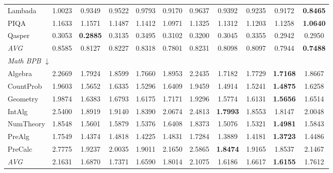 \begin{table}[htbp]
\begin{tabular}{lcccccccccc}
Lambada & 1.0023 & 0.9349 & 0.9522 & 0.9793 & 0.9170 & 0.9637 & 0.9392 & 0.9235 & 0.9172 & \textbf{0.8465} \\
PIQA & 1.1633 & 1.1571 & 1.1487 & 1.1412 & 1.0971 & 1.1325 & 1.1312 & 1.1203 & 1.1258 & \textbf{1.0640} \\
Qasper & 0.3053 & \textbf{0.2885} & 0.3135 & 0.3495 & 0.3102 & 0.3200 & 0.3045 & 0.3355 & 0.2942 & 0.2950 \\
\textit{AVG} & 0.8585 & 0.8127 & 0.8227 & 0.8318 & 0.7801 & 0.8231 & 0.8098 & 0.8097 & 0.7944 & \textbf{0.7488} \\
\midrule
\multicolumn{11}{l}{\textit{Math BPB} $\downarrow$} \\
Algebra & 2.2669 & 1.7924 & 1.8599 & 1.7660 & 1.8953 & 2.2435 & 1.7182 & 1.7729 & \textbf{1.7168} & 1.8667 \\
CountProb & 1.9603 & 1.5652 & 1.6335 & 1.5296 & 1.6409 & 1.9459 & 1.4914 & 1.5241 & \textbf{1.4875} & 1.6258 \\
Geometry & 1.9874 & 1.6383 & 1.6793 & 1.6175 & 1.7171 & 1.9296 & 1.5774 & 1.6131 & \textbf{1.5656} & 1.6514 \\
IntAlg & 2.5400 & 1.8919 & 1.9140 & 1.8390 & 2.0674 & 2.4813 & \textbf{1.7993} & 1.8553 & 1.8147 & 2.0048 \\
NumTheory & 1.8548 & 1.5601 & 1.5879 & 1.5376 & 1.6408 & 1.8373 & 1.5076 & 1.5321 & \textbf{1.4981} & 1.5843 \\
PreAlg & 1.7549 & 1.4374 & 1.4818 & 1.4225 & 1.4831 & 1.7284 & 1.3889 & 1.4181 & \textbf{1.3723} & 1.4486 \\
PreCalc & 2.7775 & 1.9237 & 2.0035 & 1.9011 & 2.1650 & 2.5865 & \textbf{1.8474} & 1.9165 & 1.8537 & 2.1467 \\
\textit{AVG} & 2.1631 & 1.6870 & 1.7371 & 1.6590 & 1.8014 & 2.1075 & 1.6186 & 1.6617 & \textbf{1.6155} & 1.7612 \\
\bottomrule
\end{tabular}
\end{table}

